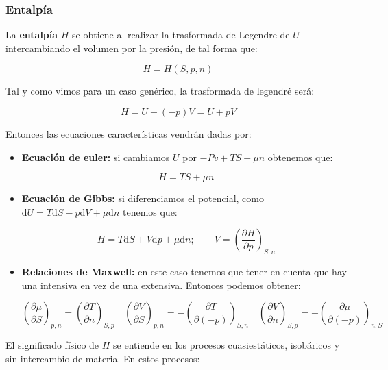 \documentclass[12pt,a4paper]{article}
\newcommand{\D}{\mathrm{d}}
\newcommand{\parentesis}[1]{\left( #1 \right)}
\newcommand{\parciales}[2]{\frac{\partial #1}{\partial #2}}
\begin{document}
\subsubsection{Entalpía}

La \textbf{entalpía} $H$ se obtiene al realizar la trasformada de Legendre de $U$ intercambiando el volumen por la presión, de tal forma que:

\begin{equation}
H = H(S,p,n)
\end{equation}

Tal y como vimos para un caso genérico, la trasformada de legendré será:

\begin{equation}
H = U - (-p)V = U + pV
\end{equation}

Entonces las ecuaciones características vendrán dadas por:

\begin{itemize}
\item \textbf{Ecuación de euler:} si cambiamos $U$ por $-Pv + TS + \mu n$ obtenemos que:

\begin{equation}
H = TS + \mu n
\end{equation}

\item \textbf{Ecuación de Gibbs:} si diferenciamos el potencial, como $\D U = T \D S -p \D V + \mu \D n$ tenemos que:

\begin{equation}
H = T \D S + V \D p + \mu \D n ; \quad \quad V = \parentesis{\parciales{H}{p}}_{S,n}
\end{equation}

\item \textbf{Relaciones de Maxwell:} en este caso tenemos que tener en cuenta que hay una intensiva en vez de una extensiva. Entonces podemos obtener:

\begin{equation}
\parentesis{\parciales{\mu}{S}}_{p, n} = \parentesis{\parciales{T}{n}}_{S,p} \quad \parentesis{\parciales{V}{S}}_{p, n} =  - \parentesis{\parciales{T}{(-p)}}_{S,n} \quad \parentesis{\parciales{V}{n}}_{S,p} = - \parentesis{\parciales{\mu}{(-p)}}_{n,S}
\end{equation}

\end{itemize}

El significado físico de $H$ se entiende en los procesos cuasiestáticos, isobáricos y sin intercambio de materia. En estos procesos:
\end{document}
